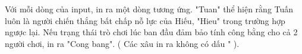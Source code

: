 Với mỗi dòng của input, in ra một dòng tương ứng. "Tuan" thể hiện rằng Tuấn luôn là người chiến thắng bất chấp nỗ lực của Hiếu, "Hieu" trong trường hợp ngược lại. Nếu trạng thái trò chơi lúc ban đầu đảm bảo tính công bằng cho cả 2 người chơi, in ra "Cong bang". ( Các xâu in ra không có dấu " ).

\
